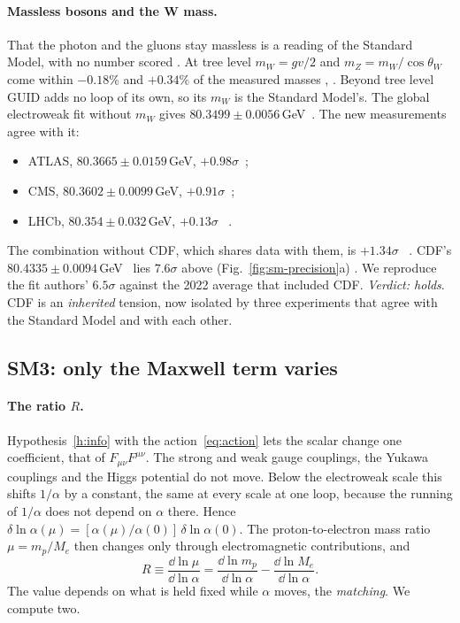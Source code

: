 \paragraph{Massless bosons and the W mass.} That the photon and the gluons stay massless is a reading of the Standard Model, with no number
scored . At tree level $m_W=gv/2$ and $m_Z=m_W/\cos\theta_W$ come within $-0.18\%$ and $+0.34\%$ of the measured masses
, . Beyond tree level GUID adds no loop of its own, so its $m_W$ is the Standard Model's. The global electroweak fit
without $m_W$ gives $80.3499\pm0.0056$\,GeV~\cite{deblas2022}. The new measurements agree with it:
\begin{itemize}[nosep]
\item ATLAS, $80.3665\pm0.0159$\,GeV, $+0.98\sigma$~\cite{atlas2024b};
\item CMS, $80.3602\pm0.0099$\,GeV, $+0.91\sigma$~\cite{cms2026};
\item LHCb, $80.354\pm0.032$\,GeV, $+0.13\sigma$~\cite{lhcb2022} .
\end{itemize}
The combination without CDF, which shares data with them, is $+1.34\sigma$~\cite{lhctev2024} . CDF's $80.4335\pm0.0094$\,GeV~\cite{cdf2022}
lies $7.6\sigma$ above (Fig.~\ref{fig:sm-precision}a) . We reproduce the fit authors' $6.5\sigma$ against the 2022 average that
included CDF. \emph{Verdict: holds}. CDF is an \emph{inherited} tension, now isolated by three experiments that agree with the Standard Model and
with each other.

\subsection{SM3: only the Maxwell term varies}\label{sec:sm-mu}

\paragraph{The ratio $R$.} Hypothesis~\ref{h:info} with the action~\eqref{eq:action} lets the scalar change one coefficient, that of
$F_{\mu\nu}F^{\mu\nu}$. The strong and weak gauge couplings, the Yukawa couplings and the Higgs potential do not move. Below the electroweak
scale this shifts $1/\alpha$ by a constant, the same at every scale at one loop, because the running of $1/\alpha$ does not depend on $\alpha$
there. Hence $\delta\ln\alpha(\mu)=[\alpha(\mu)/\alpha(0)]\,\delta\ln\alpha(0)$. The proton-to-electron mass ratio $\mu=m_p/M_e$ then changes only through
electromagnetic contributions, and
\begin{equation}\label{eq:sm-R}
R\equiv\frac{\dd\ln\mu}{\dd\ln\alpha}=\frac{\dd\ln m_p}{\dd\ln\alpha}-\frac{\dd\ln M_e}{\dd\ln\alpha}.
\end{equation}
The value depends on what is held fixed while $\alpha$ moves, the \emph{matching}. We compute two.

